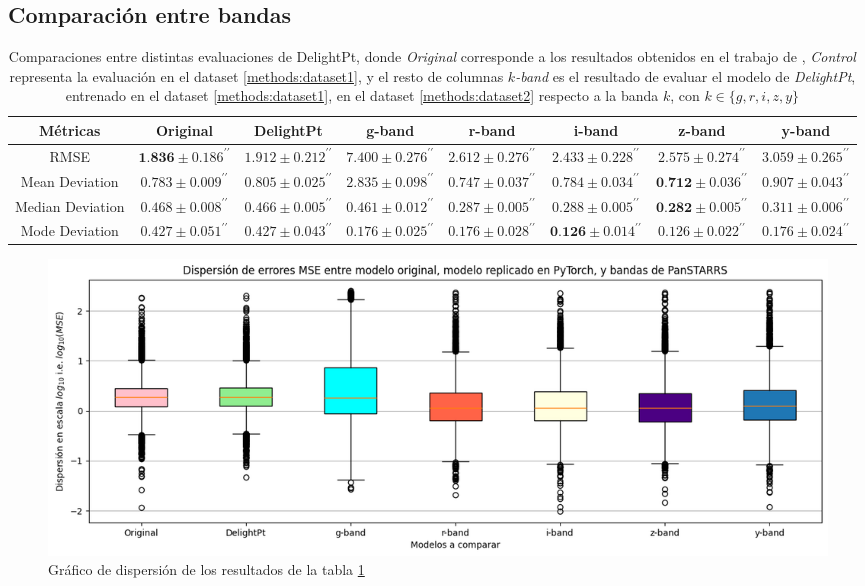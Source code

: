 \documentclass[../tesis.tex]{subfiles}
\begin{document}
\subsection{Comparación entre bandas}
\begin{table}[ht]
    \centering
    \resizebox{17cm}{!} {
        \begin{tabular}{|c|c|c|c|c|c|c|c|}
        \hline
        Métricas         & Original & DelightPt                               & g-band                          & r-band                          & i-band                                   & z-band                                   & y-band                          \\ \hline
        RMSE             & $\textbf{1.836} \pm 0.186^{\prime \prime}$ & $1.912 \pm 0.212^{\prime \prime}$ & $7.400 \pm 0.276^{\prime \prime}$ & $2.612 \pm 0.276^{\prime \prime}$ & $2.433 \pm 0.228^{\prime \prime}$          & $2.575 \pm 0.274^{\prime \prime}$          & $3.059 \pm 0.265^{\prime \prime}$ \\ \hline
        Mean Deviation   & $0.783 \pm 0.009^{\prime \prime}$ & $0.805 \pm 0.025^{\prime \prime}$          & $2.835 \pm 0.098^{\prime \prime}$ & $0.747 \pm 0.037^{\prime \prime}$ & $0.784 \pm 0.034^{\prime \prime}$          & $\textbf{0.712} \pm 0.036^{\prime \prime}$ & $0.907 \pm 0.043^{\prime \prime}$ \\ \hline
        Median Deviation & $0.468 \pm 0.008^{\prime \prime}$ & $0.466 \pm 0.005^{\prime \prime}$          & $0.461 \pm 0.012^{\prime \prime}$ & $0.287 \pm 0.005^{\prime \prime}$ & $0.288 \pm 0.005^{\prime \prime}$          & $\textbf{0.282} \pm 0.005^{\prime \prime}$ & $0.311 \pm 0.006^{\prime \prime}$ \\ \hline
        Mode Deviation   & $0.427 \pm 0.051^{\prime \prime}$ & $0.427 \pm 0.043^{\prime \prime}$          & $0.176 \pm 0.025^{\prime \prime}$ & $0.176 \pm 0.028^{\prime \prime}$ & $\textbf{0.126} \pm 0.014^{\prime \prime}$ & $0.126 \pm 0.022^{\prime \prime}$          & $0.176 \pm 0.024^{\prime \prime}$ \\ \hline
    \end{tabular}
    }
    \caption{Comparaciones entre distintas evaluaciones de DelightPt, donde \textit{Original} corresponde a los resultados obtenidos en el trabajo de \cite{delight}, \textit{Control} representa la evaluación en el dataset \ref{methods:dataset1}, y el resto de columnas \textit{$k$-band} es el resultado de evaluar el modelo de \textit{DelightPt}, entrenado en el dataset \ref{methods:dataset1}, en el dataset \ref{methods:dataset2} respecto a la banda $k$, con $k \in \{g, r, 
 i, z, y\}$}
    \label{tab:transfer_learning}
\end{table}

\begin{figure}[ht]
    \centering
    \includegraphics[width=1\linewidth]{images/results/delight_dispersion_bands.png}
    \caption{Gráfico de dispersión de los resultados de la tabla \ref{tab:transfer_learning}}
    \label{fig:graph-transfer-learning}
\end{figure}
\end{document}
